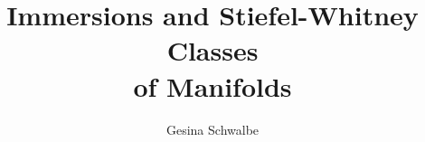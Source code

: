 \documentclass[
a4paper, english, oneside, BCOR=3mm,
bibliography=totoc, abstract=true,
]{scrreprt}
\title{Immersions and Stiefel-Whitney Classes\\of Manifolds}
\author{Gesina Schwalbe}
\date{\handindate}
\begin{document}
\maketitle



\tableofcontents












\nocite{*}
\printbibliography



\end{document}
